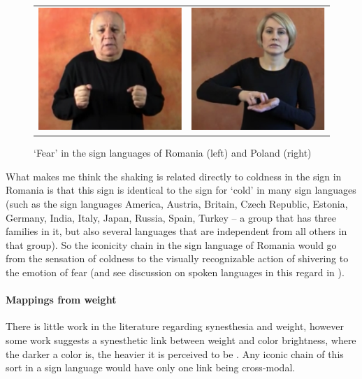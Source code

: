 \documentclass[output=paper,
modfonts
]{LSP/langsci}
\begin{document}
\begin{figure}
	\begin{tabularx}{\textwidth}{CC}
		\includegraphics{napoli_fig5a} & \includegraphics{napoli_fig5b}\\
	\end{tabularx}
	\caption{`Fear' in the sign languages of Romania (left) and Poland (right)}
	\label{fig:5}
\end{figure}

What makes me think the shaking is related directly to coldness in the
sign in Romania is that this sign is identical to the sign for `cold' in
many sign languages (such as the sign languages America, Austria,
Britain, Czech Republic, Estonia, Germany, India, Italy, Japan, Russia,
Spain, Turkey -- a group that has three families in it, but also several
languages that are independent from all others in that group). So the
iconicity chain in the sign language of Romania would go from the
sensation of coldness to the visually recognizable action of shivering
to the emotion of fear (and see discussion on spoken languages in this
regard in \citealt{atkins1995}).

\paragraph{Mappings from weight} There is little work in the literature
regarding synesthesia and weight, however some work suggests a
synesthetic link between weight and color brightness, where the darker a
color is, the heavier it is perceived to be \citep{ward2008}. Any iconic chain of this sort in a sign language would have only
one link being cross-modal.
\end{document}
